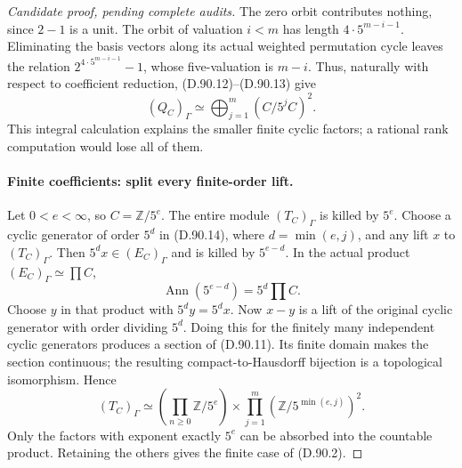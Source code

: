 \begin{proof}[Candidate proof, pending complete audits]
The zero orbit contributes nothing, since \(2-1\) is a unit.
The orbit of valuation \(i<m\) has length
\(4\cdot5^{m-i-1}\). Eliminating the basis vectors along
its actual weighted permutation cycle leaves the relation
\(2^{4\cdot5^{m-i-1}}-1\), whose five-valuation is
\(m-i\). Thus, naturally with respect to coefficient
reduction, (D.90.12)--(D.90.13) give
\[
                  (Q_C)_\Gamma\simeq
                            \bigoplus_{j=1}^{m}(C/5^jC)^2.
                                                               \tag{D.90.14}
\]
This integral calculation explains the smaller finite cyclic
factors; a rational rank computation would lose all of them.

\paragraph{Finite coefficients: split every finite-order lift.}
Let \(0<e<\infty\), so \(C=\mathbb Z/5^e\).
The entire module \((T_C)_\Gamma\) is killed by \(5^e\).
Choose a cyclic generator of order \(5^d\) in (D.90.14),
where \(d=\min(e,j)\), and any lift \(x\) to
\((T_C)_\Gamma\). Then \(5^d x\in(E_C)_\Gamma\)
and is killed by \(5^{e-d}\). In the actual product
\((E_C)_\Gamma\simeq\prod C\),
\[
      \operatorname{Ann}(5^{e-d})=5^d\prod C.
\]
Choose \(y\) in that product with \(5^dy=5^dx\).
Now \(x-y\) is a lift of the original cyclic generator
with order dividing \(5^d\). Doing this for the finitely
many independent cyclic generators produces a section of
(D.90.11). Its finite domain makes the section continuous;
the resulting compact-to-Hausdorff bijection is a topological
isomorphism. Hence
\[
 (T_C)_\Gamma\simeq
       \left(\prod_{n\ge0}\mathbb Z/5^e\right)
             \times\prod_{j=1}^{m}(\mathbb Z/5^{\min(e,j)})^2.
                                                               \tag{D.90.15}
\]
Only the factors with exponent exactly \(5^e\) can be
absorbed into the countable product. Retaining the others
gives the finite case of (D.90.2).


\end{proof}
